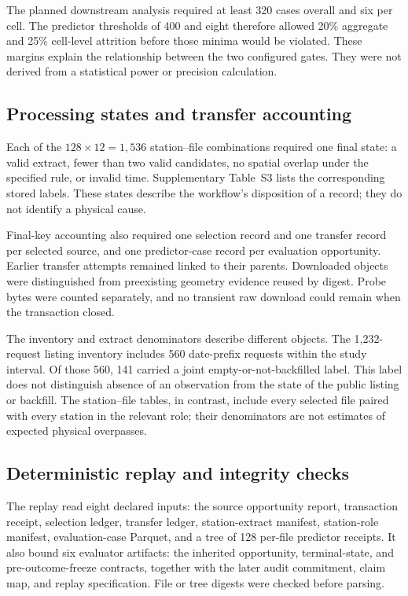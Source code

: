 The planned downstream analysis required at least 320 cases overall and six per cell. The predictor thresholds of 400 and eight therefore allowed 20\% aggregate and 25\% cell-level attrition before those minima would be violated. These margins explain the relationship between the two configured gates. They were not derived from a statistical power or precision calculation.

\subsection{Processing states and transfer accounting}
Each of the $128\times12=1{,}536$ station--file combinations required one final state: a valid extract, fewer than two valid candidates, no spatial overlap under the specified rule, or invalid time. Supplementary Table~S3 lists the corresponding stored labels. These states describe the workflow's disposition of a record; they do not identify a physical cause.

Final-key accounting also required one selection record and one transfer record per selected source, and one predictor-case record per evaluation opportunity. Earlier transfer attempts remained linked to their parents. Downloaded objects were distinguished from preexisting geometry evidence reused by digest. Probe bytes were counted separately, and no transient raw download could remain when the transaction closed.

The inventory and extract denominators describe different objects. The 1,232-request listing inventory includes 560 date-prefix requests within the study interval. Of those 560, 141 carried a joint empty-or-not-backfilled label. This label does not distinguish absence of an observation from the state of the public listing or backfill. The station--file tables, in contrast, include every selected file paired with every station in the relevant role; their denominators are not estimates of expected physical overpasses.

\subsection{Deterministic replay and integrity checks}
The replay read eight declared inputs: the source opportunity report, transaction receipt, selection ledger, transfer ledger, station-extract manifest, station-role manifest, evaluation-case Parquet, and a tree of 128 per-file predictor receipts. It also bound six evaluator artifacts: the inherited opportunity, terminal-state, and pre-outcome-freeze contracts, together with the later audit commitment, claim map, and replay specification. File or tree digests were checked before parsing.

